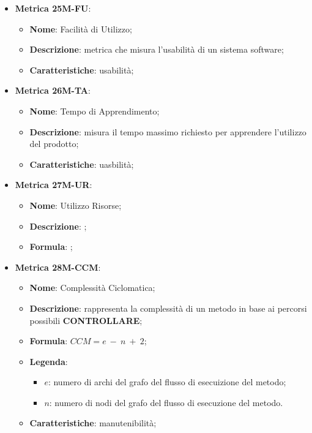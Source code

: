 \begin{itemize}
    \item \textbf{Metrica 25M-FU}:
    \begin{itemize}
        \item \textbf{Nome}: Facilità di Utilizzo;
        \item \textbf{Descrizione}: metrica che misura l'usabilità di un sistema software;
        \item \textbf{Caratteristiche}: usabilità;
    \end{itemize}
\end{itemize}

\begin{itemize}
    \item \textbf{Metrica 26M-TA}:
    \begin{itemize}
        \item \textbf{Nome}: Tempo di Apprendimento;
        \item \textbf{Descrizione}: misura il tempo massimo richiesto per apprendere l'utilizzo del prodotto;
        \item \textbf{Caratteristiche}: uasbilità;
    \end{itemize}
\end{itemize}

\begin{itemize}
    \item \textbf{Metrica 27M-UR}:
    \begin{itemize}
        \item \textbf{Nome}: Utilizzo Risorse;
        \item \textbf{Descrizione}: ;
        \item \textbf{Formula}: ;
    \end{itemize}
\end{itemize}

\begin{itemize}
    \item \textbf{Metrica 28M-CCM}:
    \begin{itemize}
        \item \textbf{Nome}: Complessità Ciclomatica;
        \item \textbf{Descrizione}: rappresenta la complessità di un metodo in base ai percorsi possibili \textbf{CONTROLLARE};
        \item \textbf{Formula}: $CCM = e\: -\: n\: +\: 2$;
        \item \textbf{Legenda}: 
        \begin{itemize}
            \item $e$: numero di archi del grafo del flusso di esecuizione del metodo;
            \item $n$: numero di nodi del grafo del flusso di esecuzione del metodo.
        \end{itemize}
        \item \textbf{Caratteristiche}: manutenibilità;
    \end{itemize}
\end{itemize}

